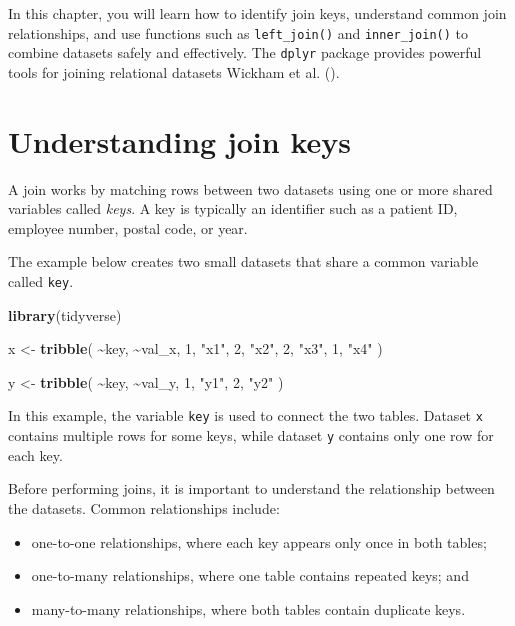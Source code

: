 \documentclass[
  11pt,
  oneside]{book}
\newenvironment{Shaded}{\begin{snugshade}}{\end{snugshade}}
\newcommand{\DecValTok}[1]{\textcolor[rgb]{0.00,0.00,0.81}{#1}}
\newcommand{\FunctionTok}[1]{\textcolor[rgb]{0.13,0.29,0.53}{\textbf{#1}}}
\newcommand{\NormalTok}[1]{#1}
\newcommand{\OtherTok}[1]{\textcolor[rgb]{0.56,0.35,0.01}{#1}}
\newcommand{\SpecialCharTok}[1]{\textcolor[rgb]{0.81,0.36,0.00}{\textbf{#1}}}
\newcommand{\StringTok}[1]{\textcolor[rgb]{0.31,0.60,0.02}{#1}}
\providecommand{\tightlist}{%
  \setlength{\itemsep}{0pt}\setlength{\parskip}{0pt}}
\begin{document}
In this chapter, you will learn how to identify join keys, understand common join relationships, and use functions such as \texttt{left\_join()} and \texttt{inner\_join()} to combine datasets safely and effectively. The \texttt{dplyr} package provides powerful tools for joining relational datasets Wickham et al. ().

\section{Understanding join keys}\label{understanding-join-keys}

A join works by matching rows between two datasets using one or more shared variables called \emph{keys}. A key is typically an identifier such as a patient ID, employee number, postal code, or year.

The example below creates two small datasets that share a common variable called \texttt{key}.

\begin{Shaded}
\begin{Highlighting}[]
\FunctionTok{library}\NormalTok{(tidyverse)}

\NormalTok{x }\OtherTok{\textless{}{-}} \FunctionTok{tribble}\NormalTok{(}
  \SpecialCharTok{\textasciitilde{}}\NormalTok{key, }\SpecialCharTok{\textasciitilde{}}\NormalTok{val\_x,}
     \DecValTok{1}\NormalTok{, }\StringTok{"x1"}\NormalTok{,}
     \DecValTok{2}\NormalTok{, }\StringTok{"x2"}\NormalTok{,}
     \DecValTok{2}\NormalTok{, }\StringTok{"x3"}\NormalTok{,}
     \DecValTok{1}\NormalTok{, }\StringTok{"x4"}
\NormalTok{)}

\NormalTok{y }\OtherTok{\textless{}{-}} \FunctionTok{tribble}\NormalTok{(}
  \SpecialCharTok{\textasciitilde{}}\NormalTok{key, }\SpecialCharTok{\textasciitilde{}}\NormalTok{val\_y,}
     \DecValTok{1}\NormalTok{, }\StringTok{"y1"}\NormalTok{,}
     \DecValTok{2}\NormalTok{, }\StringTok{"y2"}
\NormalTok{)}
\end{Highlighting}
\end{Shaded}

In this example, the variable \texttt{key} is used to connect the two tables. Dataset \texttt{x} contains multiple rows for some keys, while dataset \texttt{y} contains only one row for each key.

Before performing joins, it is important to understand the relationship between the datasets. Common relationships include:

\begin{itemize}
\tightlist
\item
  one-to-one relationships, where each key appears only once in both tables;
\item
  one-to-many relationships, where one table contains repeated keys; and
\item
  many-to-many relationships, where both tables contain duplicate keys.
\end{itemize}
\end{document}
